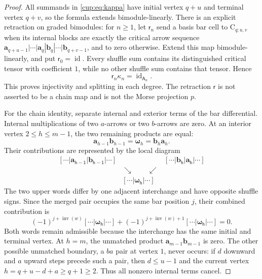 \documentclass[a4paper,11pt,oneside,reqno]{amsart}
\theoremstyle{definition}
\numberwithin{equation}{section}
\begin{document}
\begin{proof}
All summands in \eqref{cup:eq:kappa} have initial vertex $q+u$
and terminal vertex $q+v$, so the formula extends bimodule-linearly.
There is an explicit retraction on graded bimodules: for $n\geq1$,
let $\mathsf r_n$ send a basis bar cell to $\mathrm C_{q;u,v}$ when
its internal blocks are exactly the critical arrow sequence
$\mathbf a_{q+u-1}|\cdots|\mathbf a_q|
\mathbf b_q|\cdots|\mathbf b_{q+v-1}$, and to zero otherwise.
Extend this map bimodule-linearly, and put
$\mathsf r_0=\operatorname{id}$. Every shuffle sum contains its
distinguished critical tensor with coefficient $1$, while no other
shuffle sum contains that tensor. Hence
\begin{equation}\label{cup:eq:kappa-retraction}
 \boxed{\mathsf r_n\kappa_n=\operatorname{id}_{\mathsf A_n}.}
\end{equation}
This proves injectivity and splitting in each degree. The retraction
$\mathsf r$ is not asserted to be a chain map and is not the Morse
projection $p$.

For the chain identity, separate internal and exterior terms of the
bar differential. Internal multiplications of two $a$-arrows or two
$b$-arrows are zero. At an interior vertex $2\leq h\leq m-1$,
the two remaining products are equal:
\[
 \mathbf a_{h-1}\mathbf b_{h-1}
 =\boldsymbol\omega_h
 =\mathbf b_h\mathbf a_h.
\]
Their contributions are represented by the local diagram
\[
\begin{array}{ccc}
 \mathsf{[\cdots|\mathbf a_{h-1}|\mathbf b_{h-1}|\cdots]}
 &&\mathsf{[\cdots|\mathbf b_h|\mathbf a_h|\cdots]}\\[-1mm]
 &\searrow\qquad\swarrow&\\[-1mm]
 &\mathsf{[\cdots|\boldsymbol\omega_h|\cdots]}&
\end{array}
\]
The two upper words differ by one adjacent interchange and have
opposite shuffle signs. Since the merged pair occupies the same bar
position $j$, their combined contribution is
\begin{equation}\label{cup:eq:internal-cancellation}
 (-1)^{j+\operatorname{inv}(w)}
 \mathsf{[\cdots|\boldsymbol\omega_h|\cdots]}
 +(-1)^{j+\operatorname{inv}(w)+1}
 \mathsf{[\cdots|\boldsymbol\omega_h|\cdots]}=0.
\end{equation}
Both words remain admissible because the interchange has the same
initial and terminal vertex. At $h=m$, the unmatched product
$\mathbf a_{m-1}\mathbf b_{m-1}$ is zero. The other possible
unmatched boundary, a $ba$ pair at vertex $1$, never occurs: if $d$
downward and $a$ upward steps precede such a pair, then $d\leq u-1$
and the current vertex $h=q+u-d+a\geq q+1\geq2$. Thus all nonzero
internal terms cancel.


\end{proof}
\end{document}
